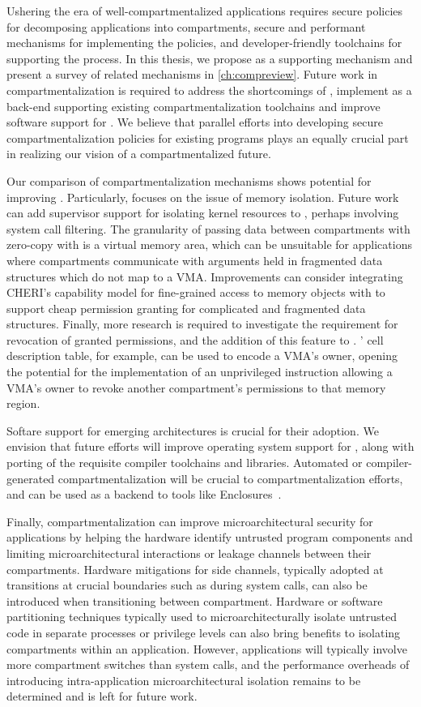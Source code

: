 Ushering the era of well-compartmentalized applications requires 
secure policies for decomposing applications into compartments,
secure and performant mechanisms for implementing the policies, and
developer-friendly toolchains for supporting the process.
In this thesis, we propose \seccells as a supporting mechanism and
present a survey of related mechanisms in \autoref{ch:compreview}.
Future work in compartmentalization is required to address the
shortcomings of \seccells, implement \seccells as a back-end supporting
existing compartmentalization toolchains and
improve software support for \seccells.
We believe that parallel efforts into developing secure compartmentalization
policies for existing programs plays an equally crucial part in realizing
our vision of a compartmentalized future.

Our comparison of compartmentalization mechanisms shows potential
for improving \seccells.
Particularly, \seccells focuses on the issue of memory isolation.
Future work can add supervisor support for isolating kernel resources
to \seccells, perhaps involving system call filtering.
The granularity of passing data between compartments with zero-copy with
\seccells is a virtual memory area, which can be unsuitable for 
applications where compartments communicate with arguments held in 
fragmented data structures which do not map to a VMA.
Improvements can consider integrating CHERI's capability model for
fine-grained access to memory objects with \seccells to support cheap 
permission granting for complicated and fragmented data structures.
Finally, more research is required to investigate the requirement for
revocation of granted permissions, and the addition of this feature
to \seccells.
\seccells' cell description table, for example, can be used to encode
a VMA's owner, opening the potential for the implementation of an
unprivileged instruction allowing a VMA's owner to revoke another
compartment's permissions to that memory region.

Softare support for emerging architectures is crucial for their adoption.
We envision that future efforts will improve operating system support for
\seccells, along with porting of the requisite compiler toolchains and
libraries.
Automated or compiler-generated compartmentalization will be crucial to
compartmentalization efforts, and \seccells can be used as a backend to
tools like Enclosures~\cite{GhosnKPLB21}.

Finally, compartmentalization can improve microarchitectural security for
applications by helping the hardware identify untrusted program components
and limiting microarchitectural interactions or leakage channels between
their compartments.
Hardware mitigations for side channels, typically adopted at transitions
at crucial boundaries such as during system calls, can also be introduced
when transitioning between compartment.
Hardware or software partitioning techniques typically used to 
microarchitecturally isolate untrusted code in separate processes or privilege
levels can also bring benefits to isolating compartments within an application.
However, applications will typically involve more compartment switches than 
system calls, and the performance overheads of introducing intra-application
microarchitectural isolation remains to be determined and is left for future
work.
